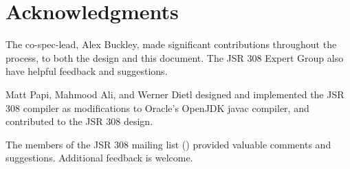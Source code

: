 \documentclass[10pt]{article}
\begin{document}
% 
% 
% 
% 
% 


\section*{Acknowledgments}

The co-spec-lead, Alex Buckley, made significant contributions throughout
the process, to both the design and this document.  The JSR 308 Expert
Group also have helpful feedback and suggestions.

Matt Papi, Mahmood Ali, and Werner Dietl designed and implemented the JSR 308 compiler as
modifications to Oracle's OpenJDK javac compiler, and contributed to the JSR
308 design.

The members of the JSR 308 mailing list
() provided
valuable comments and suggestions.
%
Additional feedback is welcome.
\end{document}

